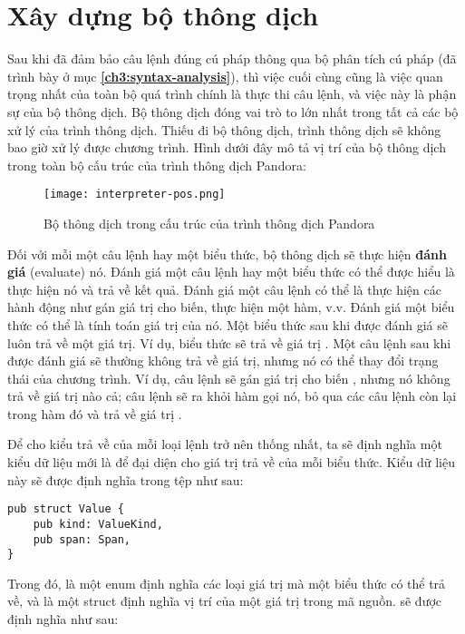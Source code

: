 \section{Xây dựng bộ thông dịch}

    Sau khi đã đảm bảo câu lệnh đúng cú pháp thông qua bộ phân tích cú pháp (đã trình bày ở mục \textbf{\ref{ch3:syntax-analysis}}), thì việc cuối cùng cũng là việc quan trọng nhất của toàn bộ quá trình chính là thực thi câu lệnh, và việc này là phận sự của bộ thông dịch. Bộ thông dịch đóng vai trò to lớn nhất trong tất cả các bộ xử lý của trình thông dịch. Thiếu đi bộ thông dịch, trình thông dịch sẽ không bao giờ xử lý được chương trình. Hình dưới đây mô tả vị trí của bộ thông dịch trong toàn bộ cấu trúc của trình thông dịch Pandora:

\begin{figure}[H]
    \centering
    \texttt{[image: interpreter-pos.png]}
    \caption{Bộ thông dịch trong cấu trúc của trình thông dịch Pandora}
\end{figure}

    Đối với mỗi một câu lệnh hay một biểu thức, bộ thông dịch sẽ thực hiện \textbf{đánh giá} (evaluate) nó. Đánh giá một câu lệnh hay một biểu thức có thể được hiểu là thực hiện nó và trả về kết quả. Đánh giá một câu lệnh có thể là thực hiện các hành động như gán giá trị cho biến, thực hiện một hàm, v.v. Đánh giá một biểu thức có thể là tính toán giá trị của nó. Một biểu thức sau khi được đánh giá sẽ luôn trả về một giá trị. Ví dụ, biểu thức  sẽ trả về giá trị . Một câu lệnh sau khi được đánh giá sẽ thường không trả về giá trị, nhưng nó có thể thay đổi trạng thái của chương trình. Ví dụ, câu lệnh  sẽ gán giá trị  cho biến , nhưng nó không trả về giá trị nào cả; câu lệnh  sẽ ra khỏi hàm gọi nó, bỏ qua các câu lệnh còn lại trong hàm đó và trả về giá trị . 

    Để cho kiểu trả về của mỗi loại lệnh trở nên thống nhất, ta sẽ định nghĩa một kiểu dữ liệu mới là  để đại diện cho giá trị trả về của mỗi biểu thức. Kiểu dữ liệu này sẽ được định nghĩa trong tệp  như sau:

\begin{lstlisting}[]
pub struct Value {
    pub kind: ValueKind,
    pub span: Span,
}
\end{lstlisting}

    Trong đó,  là một enum định nghĩa các loại giá trị mà một biểu thức có thể trả về, và  là một struct định nghĩa vị trí của một giá trị trong mã nguồn.  sẽ được định nghĩa như sau:

